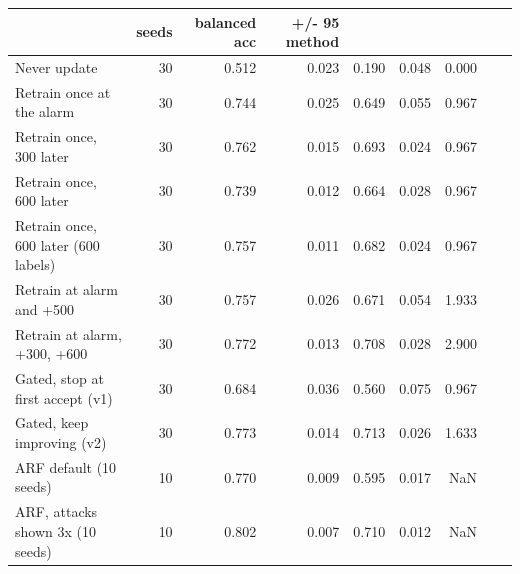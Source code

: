 \begin{tabular}{lrrrrrr}
\toprule
 & seeds & balanced acc & +/- 95%
method &  &  &  &  &  &  \\
\midrule
Never update & 30 & 0.512 & 0.023 & 0.190 & 0.048 & 0.000 \\
Retrain once at the alarm & 30 & 0.744 & 0.025 & 0.649 & 0.055 & 0.967 \\
Retrain once, 300 later & 30 & 0.762 & 0.015 & 0.693 & 0.024 & 0.967 \\
Retrain once, 600 later & 30 & 0.739 & 0.012 & 0.664 & 0.028 & 0.967 \\
Retrain once, 600 later (600 labels) & 30 & 0.757 & 0.011 & 0.682 & 0.024 & 0.967 \\
Retrain at alarm and +500 & 30 & 0.757 & 0.026 & 0.671 & 0.054 & 1.933 \\
Retrain at alarm, +300, +600 & 30 & 0.772 & 0.013 & 0.708 & 0.028 & 2.900 \\
Gated, stop at first accept (v1) & 30 & 0.684 & 0.036 & 0.560 & 0.075 & 0.967 \\
Gated, keep improving (v2) & 30 & 0.773 & 0.014 & 0.713 & 0.026 & 1.633 \\
ARF default (10 seeds) & 10 & 0.770 & 0.009 & 0.595 & 0.017 & NaN \\
ARF, attacks shown 3x (10 seeds) & 10 & 0.802 & 0.007 & 0.710 & 0.012 & NaN \\
\bottomrule
\end{tabular}
